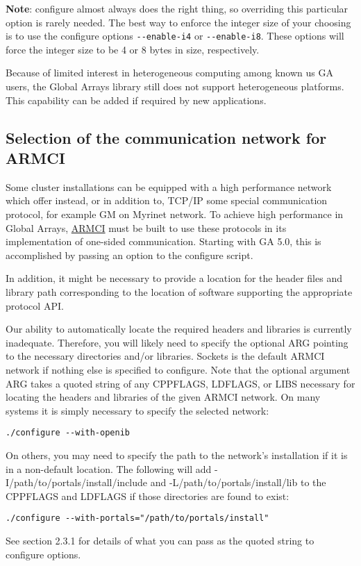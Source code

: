 \textbf{Note}: configure almost always does the right thing, so overriding this
particular option is rarely needed. The best way to enforce the integer size of
your choosing is to use the configure options \texttt{-{}-enable-i4} or
\texttt{-{}-enable-i8}. These options will force the integer size to be 4 or 8
bytes in size, respectively. 

Because of limited interest in heterogeneous computing among known us GA users,
the Global Arrays library still does not support heterogeneous platforms. This
capability can be added if required by new applications. 

\subsection{Selection of the communication network for ARMCI}

Some cluster installations can be equipped with a high performance network
which offer instead, or in addition to, TCP/IP some special communication
protocol, for example GM on Myrinet network. To achieve high performance in
Global Arrays, \href{http://www.emsl.pnl.gov/docs/parsoft/armci}{ARMCI} must be
built to use these protocols in its implementation of one-sided communication.
Starting with GA 5.0, this is accomplished by passing an option to the
configure script. 

In addition, it might be necessary to provide a location for the header files
and library path corresponding to the location of software supporting the
appropriate protocol API. 

Our ability to automatically locate the required headers and libraries is
currently inadequate. Therefore, you will likely need to specify the optional
ARG pointing to the necessary directories and/or libraries.  Sockets is the
default ARMCI network if nothing else is specified to configure. Note that the
optional argument ARG takes a quoted string of any CPPFLAGS, LDFLAGS, or LIBS
necessary for locating the headers and libraries of the given ARMCI network. On
many systems it is simply necessary to specify the selected network: 
\begin{verbatim}
./configure --with-openib 
\end{verbatim}
On others, you may need to specify the path to the network's installation if it
is in a non-default location. The following will add
-I/path/to/portals/install/include and -L/path/to/portals/install/lib to the
CPPFLAGS and LDFLAGS if those directories are found to exist: 
\begin{verbatim}
./configure --with-portals="/path/to/portals/install"
\end{verbatim}
See section 2.3.1 for details of what you can pass as the quoted string to
configure options. 

